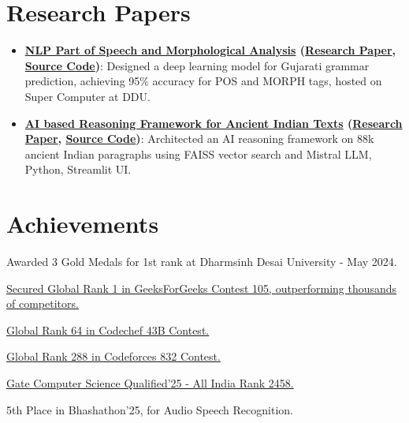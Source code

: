 \documentclass[a4paper,10pt]{article}
\newcommand{\resumeItem}[2]{
  \item\small{
    \textbf{#1}{: #2 \vspace{-2pt}}
  }
}
\newcommand{\resumeSubItem}[2]{\resumeItem{#1}{#2}\vspace{-3pt}}
\newcommand{\resumeSubHeadingListStart}{\begin{itemize}[leftmargin=*]}
\newcommand{\resumeSubHeadingListEnd}{\end{itemize}}
\begin{document}
\section{Research Papers}
\resumeSubHeadingListStart
\resumeSubItem{\href{https://ijisae.org/index.php/IJISAE/article/view/5290/4016}{NLP Part of Speech and Morphological Analysis} (\href{https://ijisae.org/index.php/IJISAE/article/view/5290/4016}{Research Paper}, \href{https://github.com/om-ashish-soni/nlp-research-pos-morph-analysis-gujarti/tree/main}{Source Code})}
{Designed a deep learning model for Gujarati grammar prediction, achieving 95\% accuracy for POS and MORPH tags, hosted on Super Computer at DDU. }
\vspace{2pt}
\resumeSubItem{\href{https://www.researchgate.net/publication/390543632_Vivechan_AI_Extracting_Wisdom_from_Ancient_Indian_Texts_Through_LLM}
{AI based Reasoning Framework for Ancient Indian Texts} (\href{https://www.researchgate.net/publication/390543632_Vivechan_AI_Extracting_Wisdom_from_Ancient_Indian_Texts_Through_LLM}{Research Paper}, \href{https://github.com/om-ashish-soni/vivechan-ai-v3}{Source Code})}
{Architected an AI reasoning framework on 88k ancient Indian paragraphs using FAISS vector search and Mistral LLM, Python, Streamlit UI.}
\vspace{4pt}
\resumeSubHeadingListEnd

\section{Achievements}
\begin{description}[font=$\bullet$]
\item {Awarded 3 Gold Medals for 1st rank at Dharmsinh Desai University - May 2024.}
\vspace{-5pt}
\item {\href{https://practice.geeksforgeeks.org/contest/gfg-weekly-coding-contest-105/leaderboard}
{Secured Global Rank 1 in GeeksForGeeks Contest 105, outperforming thousands of competitors.} }
\vspace{-5pt}
\item {\href{https://www.codechef.com/rankings/START43B?itemsPerPage=100&order=asc&page=1&search=om_ashish_soni&sortBy=rank}
{Global Rank 64 in Codechef 43B Contest.}}
\vspace{-5pt}
\item {\href{https://codeforces.com/contest/1747/standings/page/2}
{Global Rank 288 in Codeforces 832 Contest.  }}
\vspace{-5pt}
\item {\href{https://drive.google.com/file/d/1DUTp-W9xiTx4kVTVMqlbC6NIAOICt6ct/view?usp=drivesdk}
{Gate Computer Science Qualified'25 - All India Rank 2458.}}
\vspace{-5pt}
\item {5th Place in Bhashathon'25, for Audio Speech Recognition.}
\vspace{2pt}
\end{description}
\end{document}

